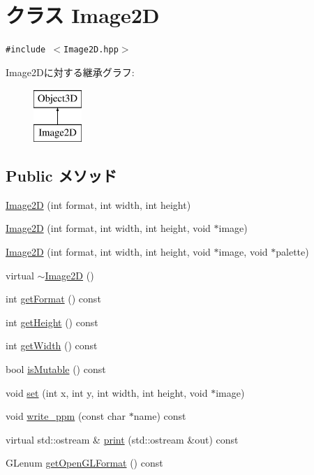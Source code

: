 \hypertarget{classm3g_1_1Image2D}{
\section{クラス Image2D}
\label{classm3g_1_1Image2D}
}
{\tt \#include $<$Image2D.hpp$>$}

Image2Dに対する継承グラフ:\begin{figure}[H]
\begin{center}
\leavevmode
\includegraphics[height=2cm]{classm3g_1_1Image2D}
\end{center}
\end{figure}
\subsection*{Public メソッド}
\begin{CompactItemize}
\item 
\hyperlink{classm3g_1_1Image2D_cea21be298c6584490d2b714c4b29d6b}{Image2D} (int format, int width, int height)
\item 
\hyperlink{classm3g_1_1Image2D_8cf9a47f24ed50fe66686c1117fb048c}{Image2D} (int format, int width, int height, void $\ast$image)
\item 
\hyperlink{classm3g_1_1Image2D_f498914ceac20ff9b1708c55ff1484e6}{Image2D} (int format, int width, int height, void $\ast$image, void $\ast$palette)
\item 
virtual \hyperlink{classm3g_1_1Image2D_7ac703fe7edbb053dd2246ea1bb43200}{$\sim$Image2D} ()
\item 
int \hyperlink{classm3g_1_1Image2D_c08e2752176d267cc4429d4d185975b8}{getFormat} () const 
\item 
int \hyperlink{classm3g_1_1Image2D_317329daf960a1759801c0f16d43d5a3}{getHeight} () const 
\item 
int \hyperlink{classm3g_1_1Image2D_f149cb053bc8b5fbc1364b5dbb934488}{getWidth} () const 
\item 
bool \hyperlink{classm3g_1_1Image2D_d687aabba553d1c66bfc253ec7e5bd05}{isMutable} () const 
\item 
void \hyperlink{classm3g_1_1Image2D_fe9ef1abefb9e92b38687e27c9004bdc}{set} (int x, int y, int width, int height, void $\ast$image)
\item 
void \hyperlink{classm3g_1_1Image2D_6ec48e0681b8805c75ecadf4ba4a40cb}{write\_\-ppm} (const char $\ast$name) const 
\item 
virtual std::ostream \& \hyperlink{classm3g_1_1Image2D_6fea17fa1532df3794f8cb39cb4f911f}{print} (std::ostream \&out) const 
\item 
GLenum \hyperlink{classm3g_1_1Image2D_7923da2fe82fee768ec9937a693e843c}{getOpenGLFormat} () const 
\end{CompactItemize}
